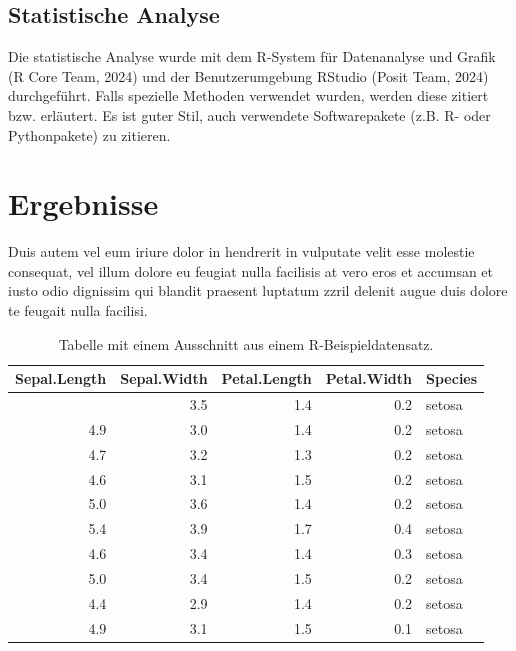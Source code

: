 \documentclass[
  11pt,
  a4paper,
]{tudscrreprt}
\begin{document}
\section{Statistische Analyse}\label{statistische-analyse}

Die statistische Analyse wurde mit dem R-System für Datenanalyse und
Grafik (R Core Team, 2024) und der Benutzerumgebung RStudio (Posit Team,
2024) durchgeführt. Falls spezielle Methoden verwendet wurden, werden
diese zitiert bzw. erläutert. Es ist guter Stil, auch verwendete
Softwarepakete (z.B. R- oder Pythonpakete) zu zitieren.

\chapter{Ergebnisse}\label{ergebnisse}

Duis autem vel eum iriure dolor in hendrerit in vulputate velit esse
molestie consequat, vel illum dolore eu feugiat nulla facilisis at vero
eros et accumsan et iusto odio dignissim qui blandit praesent luptatum
zzril delenit augue duis dolore te feugait nulla facilisi.

\begin{longtable}[]{@{}rrrrl@{}}

\caption{\label{tbl-beispieltabelle}Tabelle mit einem Ausschnitt aus
einem R-Beispieldatensatz.}

\tabularnewline

\toprule\noalign{}
Sepal.Length & Sepal.Width & Petal.Length & Petal.Width & Species \\
\midrule\noalign{}
\endhead
\bottomrule\noalign{}
\endlastfoot
5.1 & 3.5 & 1.4 & 0.2 & setosa \\
4.9 & 3.0 & 1.4 & 0.2 & setosa \\
4.7 & 3.2 & 1.3 & 0.2 & setosa \\
4.6 & 3.1 & 1.5 & 0.2 & setosa \\
5.0 & 3.6 & 1.4 & 0.2 & setosa \\
5.4 & 3.9 & 1.7 & 0.4 & setosa \\
4.6 & 3.4 & 1.4 & 0.3 & setosa \\
5.0 & 3.4 & 1.5 & 0.2 & setosa \\
4.4 & 2.9 & 1.4 & 0.2 & setosa \\
4.9 & 3.1 & 1.5 & 0.1 & setosa \\

\end{longtable}
\end{document}
